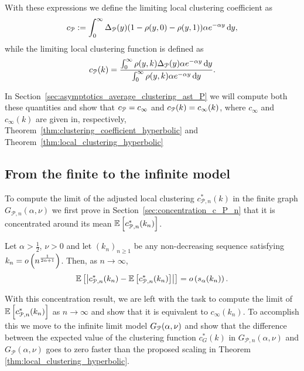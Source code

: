 With these expressions we define the limiting local clustering coefficient as
\begin{equation}\label{eq:def_average_clustering_infinite_model}
	c_{{\mathcal P}} := \int_0^\infty \Delta_{{\mathcal P}}(y) (1 - \rho(y,0) - \rho(y,1)) \alpha e^{-\alpha y} \operatorname{\mathrm{d}\hspace{-2pt}} y,
\end{equation}
while the limiting local clustering function is defined as
\begin{equation}\label{eq:def_c_infty_k}
	c_{{\mathcal P}}(k) = \frac{\int_0^\infty \rho(y,k) \Delta_{{\mathcal P}}(y) \alpha e^{-\alpha y} \operatorname{\mathrm{d}\hspace{-2pt}} y}{\int_0^\infty \rho(y,k) \alpha e^{-\alpha y} \operatorname{\mathrm{d}\hspace{-2pt}} y}.
\end{equation}

In Section~\ref{sec:asymptotics_average_clustering_ast_P} we will compute both these quantities and show that $c_{{\mathcal P}} = c_\infty$ and $c_{{\mathcal P}}(k) = c_\infty(k)$, where $c_\infty$ and $c_\infty(k)$ are given in, respectively, Theorem~\ref{thm:clustering_coefficient_hyperbolic} and Theorem~\ref{thm:local_clustering_hyperbolic}

\subsection{From the finite to the infinite model}

To compute the limit of the adjusted local clustering $c_{\mathcal{P},n}^\ast(k)$ in the finite graph $G_{\mathcal{P},n}(\alpha, \nu)$ we first prove in Section~\ref{sec:concentration_c_P_n} that it is concentrated around its mean $\mathbb{E}\left[c_{\mathcal{P},n}^\ast(k_n)\right]$.

\begin{proposition}\label{prop:concentration_local_clustering_P_n}
Let $\alpha > \frac{1}{2}$, $\nu > 0$ and let $(k_n)_{n \ge 1}$ be any non-decreasing sequence satisfying $k_n = o\left(n^{\frac{1}{2\alpha+1}}\right)$. Then, as $n \to \infty$,
\[
	\mathbb{E}\left[\left|c_{\mathcal{P},n}^\ast(k_n) - \mathbb{E}\left[c_{\mathcal{P},n}^\ast(k_n)\right]\right|\right] = o\left(s_\alpha(k_n)\right).
\]
\end{proposition}

With this concentration result, we are left with the task to compute the limit of $\mathbb{E}\left[c_{\mathcal{P},n}^\ast(k_n)\right]$ as $n \to \infty$ and show that it is equivalent to $c_\infty(k_n)$. To accomplish this we move to the infinite limit model $G_{{\mathcal P}}(\alpha,\nu)$ and show that the difference between the expected value of the clustering function $c_G^\ast(k)$ in $G_{\mathcal{P},n}(\alpha,\nu)$ and $G_{\mathcal{P}}(\alpha,\nu)$ goes to zero faster than the proposed scaling in Theorem \ref{thm:local_clustering_hyperbolic}.


